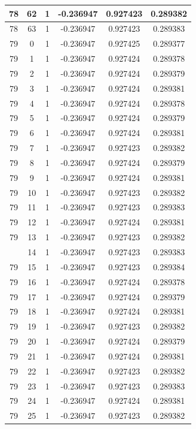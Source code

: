\documentclass[12pt,a4paper]{article}
\numberwithin{equation}{section}
\numberwithin{figure}{section}
\numberwithin{table}{section}
\begin{document}
\begin{longtable}{|c|c|c|c|c|c|}
78 & 62 & 1 & -0.236947 & 0.927423 & 0.289382 \\ \hline
78 & 63 & 1 & -0.236947 & 0.927423 & 0.289383 \\ \hline
79 & 0 & 1 & -0.236947 & 0.927425 & 0.289377 \\ \hline
79 & 1 & 1 & -0.236947 & 0.927424 & 0.289378 \\ \hline
79 & 2 & 1 & -0.236947 & 0.927424 & 0.289379 \\ \hline
79 & 3 & 1 & -0.236947 & 0.927424 & 0.289381 \\ \hline
79 & 4 & 1 & -0.236947 & 0.927424 & 0.289378 \\ \hline
79 & 5 & 1 & -0.236947 & 0.927424 & 0.289379 \\ \hline
79 & 6 & 1 & -0.236947 & 0.927424 & 0.289381 \\ \hline
79 & 7 & 1 & -0.236947 & 0.927423 & 0.289382 \\ \hline
79 & 8 & 1 & -0.236947 & 0.927424 & 0.289379 \\ \hline
79 & 9 & 1 & -0.236947 & 0.927424 & 0.289381 \\ \hline
79 & 10 & 1 & -0.236947 & 0.927423 & 0.289382 \\ \hline
79 & 11 & 1 & -0.236947 & 0.927423 & 0.289383 \\ \hline
79 & 12 & 1 & -0.236947 & 0.927424 & 0.289381 \\ \hline
79 & 13 & 1 & -0.236947 & 0.927423 & 0.289382 \\ \hline
\pagebreak
79 & 14 & 1 & -0.236947 & 0.927423 & 0.289383 \\ \hline
79 & 15 & 1 & -0.236947 & 0.927423 & 0.289384 \\ \hline
79 & 16 & 1 & -0.236947 & 0.927424 & 0.289378 \\ \hline
79 & 17 & 1 & -0.236947 & 0.927424 & 0.289379 \\ \hline
79 & 18 & 1 & -0.236947 & 0.927424 & 0.289381 \\ \hline
79 & 19 & 1 & -0.236947 & 0.927423 & 0.289382 \\ \hline
79 & 20 & 1 & -0.236947 & 0.927424 & 0.289379 \\ \hline
79 & 21 & 1 & -0.236947 & 0.927424 & 0.289381 \\ \hline
79 & 22 & 1 & -0.236947 & 0.927423 & 0.289382 \\ \hline
79 & 23 & 1 & -0.236947 & 0.927423 & 0.289383 \\ \hline
79 & 24 & 1 & -0.236947 & 0.927424 & 0.289381 \\ \hline
79 & 25 & 1 & -0.236947 & 0.927423 & 0.289382 \\ \hline

\end{longtable}
\end{document}
